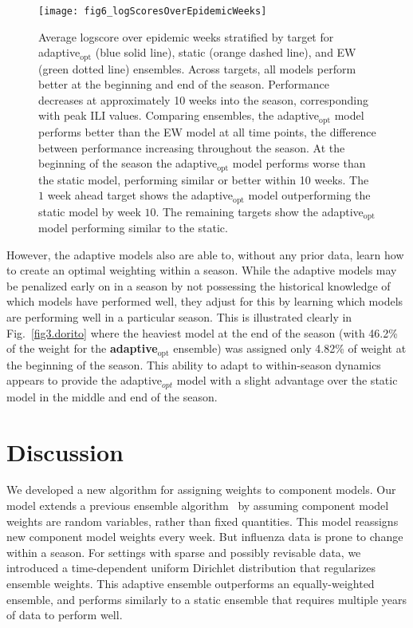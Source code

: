 \documentclass[12pt]{article}
\def\adaptOpt{\textbf{adaptive$_{\text{opt}}$ }}
\begin{document}
\graphicspath{{../_6_TLGs/_G/fig6_logScoresByEpidemicWeek/}}
\begin{figure}[ht!]
    \centering
    \texttt{[image: fig6\_logScoresOverEpidemicWeeks]}
    \caption{
    Average logscore over epidemic weeks stratified by target for adaptive$_{\mathrm{opt}}$ (blue solid line), static (orange dashed line), and EW (green dotted line) ensembles.
    Across targets, all models perform better at the beginning and end of the season.
    Performance decreases at approximately 10 weeks into the season, corresponding with peak ILI values.
    Comparing ensembles, the adaptive$_{\mathrm{opt}}$ model performs better than the EW model at all time points, the difference between performance increasing throughout the season.
    At the beginning of the season the adaptive$_{\mathrm{opt}}$ model performs worse than the static model, performing similar or better within 10 weeks. 
    The $1$ week ahead target shows the adaptive$_{\mathrm{opt}}$ model outperforming the static model by week $10$.
    The remaining targets show the adaptive$_{\mathrm{opt}}$ model performing similar to the static.
    \label{fig6.logScoresOverEpidemicWeeks}}
\end{figure}

However, the adaptive models also are able to, without any prior data, learn how to create an optimal weighting within a season. 
While the adaptive models may be penalized early on in a season by not possessing the historical knowledge of which models have performed well, they adjust for this by learning which models are performing well in a particular season. 
This is illustrated clearly in Fig.~\ref{fig3.dorito} where the heaviest model at the end of the season (with 46.2\% of the weight for the \adaptOpt ensemble) was assigned only 4.82\% of weight at the beginning of the season. 
This ability to adapt to within-season dynamics appears to provide the adaptive$_{opt}$ model with a slight advantage over the static model in the middle and end of the season.

\section{Discussion}

We developed a new algorithm for assigning weights to component models.
Our model extends a previous ensemble algorithm~\cite{reich2019collaborative} by assuming component model weights are random variables, rather than fixed quantities.
This model reassigns new component model weights every week.
But influenza data is prone to change within a season.
For settings with sparse and possibly revisable data, we introduced a time-dependent uniform Dirichlet distribution that regularizes ensemble weights. 
This adaptive ensemble outperforms an equally-weighted ensemble, and performs similarly to a static ensemble that requires multiple years of data to perform well.
\end{document}
